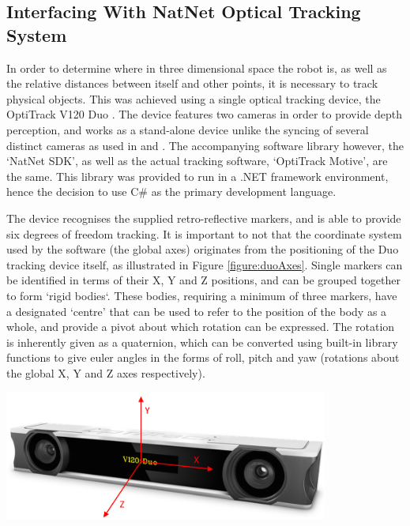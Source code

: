\documentclass[11pt]{article}
\begin{document}
\subsection{Interfacing With NatNet Optical Tracking System}

In order to determine where in three dimensional space the robot is, as well as the relative distances between itself and other points, it is necessary to track physical objects. This was achieved using a single optical tracking device, the OptiTrack V120 Duo \cite{OptiTrackSite}. The device features two cameras in order to provide depth perception, and works as a stand-alone device unlike the syncing of several distinct cameras as used in \cite{GreggSmithDesign} and \cite{GreggSmithFeedback}. The accompanying software library however, the `NatNet SDK', as well as the actual tracking software, `OptiTrack Motive', are the same. This library was provided to run in a .NET framework environment, hence the decision to use C\# as the primary development language.

The device recognises the supplied retro-reflective markers, and is able to provide six degrees of freedom tracking. It is important to not that the coordinate system used by the software (the global axes) originates from the positioning of the Duo tracking device itself, as illustrated in Figure \ref{figure:duoAxes}. Single markers can be identified in terms of their X, Y and Z positions, and can be grouped together to form `rigid bodies`. These bodies, requiring a minimum of three markers, have a designated `centre' that can be used to refer to the position of the body as a whole, and provide a pivot about which rotation can be expressed. The rotation is inherently given as a quaternion, which can be converted using built-in library functions to give euler angles in the forms of roll, pitch and yaw (rotations about the global X, Y and Z axes respectively).


\begin{center}
\includegraphics[width=0.8\textwidth]{images/duoAxes.png}
\label{figure:duoAxes}
\end{center}
\end{document}
